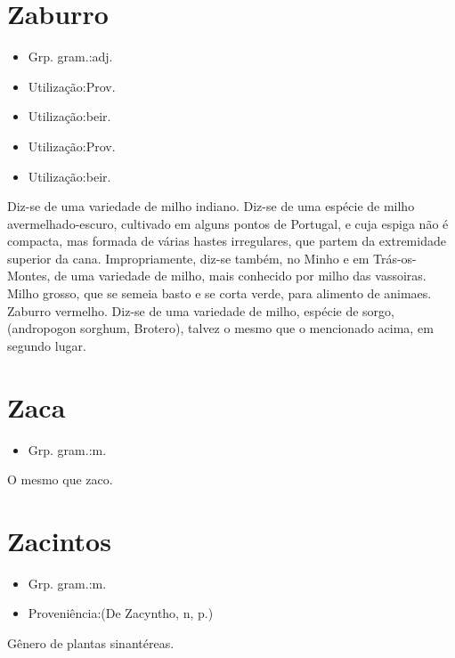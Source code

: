 \section{Zaburro}
\begin{itemize}
\item {Grp. gram.:adj.}
\end{itemize}
\begin{itemize}
\item {Utilização:Prov.}
\end{itemize}
\begin{itemize}
\item {Utilização:beir.}
\end{itemize}
\begin{itemize}
\item {Utilização:Prov.}
\end{itemize}
\begin{itemize}
\item {Utilização:beir.}
\end{itemize}
Diz-se de uma variedade de milho indiano.
Diz-se de uma espécie de milho avermelhado-escuro, cultivado em alguns pontos de Portugal, e cuja espiga não é compacta, mas formada de várias hastes irregulares, que partem da extremidade superior da cana.
Impropriamente, diz-se também, no Minho e em Trás-os-Montes, de uma variedade de milho, mais conhecido por milho das vassoiras.
Milho grosso, que se semeia basto e se corta verde, para alimento de animaes.
\textunderscore Zaburro vermelho\textunderscore . Diz-se de uma variedade de milho, espécie de sorgo, (\textunderscore andropogon sorghum\textunderscore , Brotero), talvez o mesmo que o mencionado acima, em segundo lugar.
\section{Zaca}
\begin{itemize}
\item {Grp. gram.:m.}
\end{itemize}
O mesmo que \textunderscore zaco\textunderscore .
\section{Zacintos}
\begin{itemize}
\item {Grp. gram.:m.}
\end{itemize}
\begin{itemize}
\item {Proveniência:(De \textunderscore Zacyntho\textunderscore , n, p.)}
\end{itemize}
Gênero de plantas sinantéreas.
